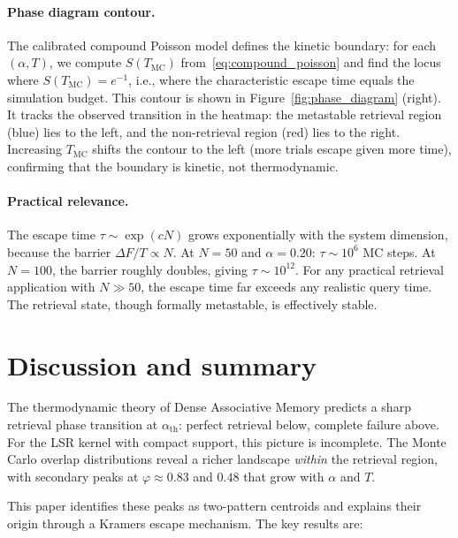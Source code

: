 \documentclass[11pt]{article}
\begin{document}
\paragraph{Phase diagram contour.}
The calibrated compound Poisson model defines the kinetic boundary: for each $(\alpha, T)$, we compute $S(T_{\mathrm{MC}})$ from~\eqref{eq:compound_poisson} and find the locus where $S(T_{\mathrm{MC}}) = e^{-1}$, i.e., where the characteristic escape time equals the simulation budget.  This contour is shown in Figure~\ref{fig:phase_diagram} (right).  It tracks the observed transition in the heatmap: the metastable retrieval region (blue) lies to the left, and the non-retrieval region (red) lies to the right.  Increasing $T_{\mathrm{MC}}$ shifts the contour to the left (more trials escape given more time), confirming that the boundary is kinetic, not thermodynamic.

\paragraph{Practical relevance.}
The escape time $\tau \sim \exp(cN)$ grows exponentially with the system dimension, because the barrier $\Delta F/T \propto N$.  At $N = 50$ and $\alpha = 0.20$: $\tau \sim 10^6$ MC steps.  At $N = 100$, the barrier roughly doubles, giving $\tau \sim 10^{12}$.  For any practical retrieval application with $N \gg 50$, the escape time far exceeds any realistic query time.  The retrieval state, though formally metastable, is effectively stable.

\section{Discussion and summary}
\label{sec:discussion}

The thermodynamic theory of Dense Associative Memory predicts a sharp retrieval phase transition at $\alpha_{\mathrm{th}}$: perfect retrieval below, complete failure above.  For the LSR kernel with compact support, this picture is incomplete.  The Monte Carlo overlap distributions reveal a richer landscape \emph{within} the retrieval region, with secondary peaks at $\varphi \approx 0.83$ and $0.48$ that grow with $\alpha$ and $T$.

This paper identifies these peaks as two-pattern centroids and explains their origin through a Kramers escape mechanism.  The key results are:
\end{document}
